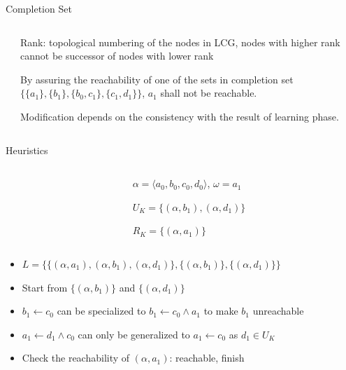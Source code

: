 \documentclass[8pt]{beamer}
\begin{document}
\begin{frame}{Completion Set}
    
    
\vspace{0.5cm}    
\begin{columns}
\begin{column}{0.65\textwidth}
    
\end{column}
\begin{column}{0.35\textwidth}
Rank: topological numbering of the nodes in LCG, nodes with higher rank cannot be successor of nodes with lower rank

\vspace{0.2cm}
By assuring the reachability of one of the sets in completion set $\{\{a_1\},\{b_1\},\{b_0,c_1\},\{c_1,d_1\}\}$, $a_1$ shall not be reachable.

\vspace{0.2cm}
Modification depends on the consistency with the result of learning phase.
\end{column}
\end{columns} 
\end{frame} 
 
\begin{frame}{Heuristics}
\begin{columns}
\begin{column}{0.6\textwidth}

\end{column}
\begin{column}{0.4\textwidth}
    $\alpha=\langle a_0,b_0,c_0,d_0\rangle$, $\omega=a_1$
    
	$U_K=\{(\alpha,b_1),(\alpha,d_1)\}$
	
	$R_K=\{(\alpha,a_1)\}$
\end{column}
\end{columns}

        \vspace{0.3cm}
        \centering
        
        
        \vspace{0.3cm}
     \begin{itemize}
        \item $L=\{\{(\alpha,a_1),(\alpha,b_1),(\alpha,d_1)\},\{(\alpha,b_1)\},\{(\alpha,d_1)\}\}$
        \item Start from $\{(\alpha,b_1)\}$ and $\{(\alpha,d_1)\}$
        \item $b_1\gets c_0$ can be specialized to $b_1\gets c_0\land a_1$ to make $b_1$ unreachable
        \item $a_1\gets d_1 \land c_0$ can only be generalized to $a_1 \gets c_0$ as $d_1\in U_K$
        \item Check the reachability of $(\alpha,a_1)$: reachable, finish
    \end{itemize}
\end{frame}
\end{document}
